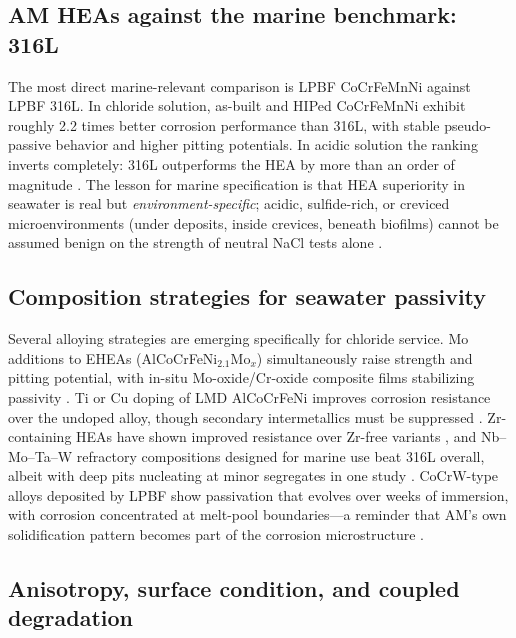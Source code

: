 \subsection{AM HEAs against the marine benchmark: 316L}

The most direct marine-relevant comparison is LPBF CoCrFeMnNi against LPBF 316L. In chloride solution, as-built and HIPed CoCrFeMnNi exhibit roughly 2.2 times better corrosion performance than 316L, with stable pseudo-passive behavior and higher pitting potentials. In acidic solution the ranking inverts completely: 316L outperforms the HEA by more than an order of magnitude \cite{lpbf_cantor_2024}. The lesson for marine specification is that HEA superiority in seawater is real but \emph{environment-specific}; acidic, sulfide-rich, or creviced microenvironments (under deposits, inside crevices, beneath biofilms) cannot be assumed benign on the strength of neutral NaCl tests alone \cite{qiu2017}.

\subsection{Composition strategies for seawater passivity}

Several alloying strategies are emerging specifically for chloride service. Mo additions to EHEAs (AlCoCrFeNi$_{2.1}$Mo$_x$) simultaneously raise strength and pitting potential, with in-situ Mo-oxide/Cr-oxide composite films stabilizing passivity \cite{mo_ehea_2026}. Ti or Cu doping of LMD AlCoCrFeNi improves corrosion resistance over the undoped alloy, though secondary intermetallics must be suppressed \cite{cagirici2024}. Zr-containing HEAs have shown improved resistance over Zr-free variants \cite{cagirici2024}, and Nb--Mo--Ta--W refractory compositions designed for marine use beat 316L overall, albeit with deep pits nucleating at minor segregates in one study \cite{cagirici2024}. CoCrW-type alloys deposited by LPBF show passivation that evolves over weeks of immersion, with corrosion concentrated at melt-pool boundaries---a reminder that AM's own solidification pattern becomes part of the corrosion microstructure \cite{lpbf_coocrw2023}.

\subsection{Anisotropy, surface condition, and coupled degradation}

